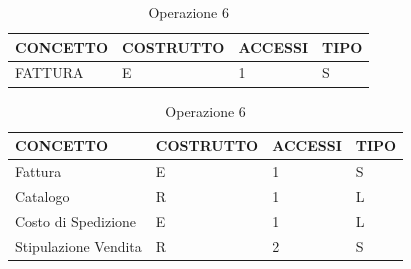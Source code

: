 \begin{table}[H]
\centering
\caption{Operazione 6}
\begin{tabular}{llll}
\\ \hline
\multicolumn{1}{|l|}{\textbf{CONCETTO}} & \multicolumn{1}{l|}{\textbf{COSTRUTTO}} & \multicolumn{1}{l|}{\textbf{ACCESSI}} & \multicolumn{1}{l|}{\textbf{TIPO}} \\ \hline
\multicolumn{1}{|l|}{FATTURA}
& \multicolumn{1}{l|}{E}                  & \multicolumn{1}{l|}{1}                & \multicolumn{1}{l|}{S}             \\ \hline
\end{tabular}
\end{table}


\begin{table}[H]
\centering
\caption{Operazione 6}
\begin{tabular}{llll}
\\ \hline
\multicolumn{1}{|l|}{\textbf{CONCETTO}} & \multicolumn{1}{l|}{\textbf{COSTRUTTO}} & \multicolumn{1}{l|}{\textbf{ACCESSI}} & \multicolumn{1}{l|}{\textbf{TIPO}} \\ \hline
\multicolumn{1}{|l|}{Fattura}
& \multicolumn{1}{l|}{E}                  & \multicolumn{1}{l|}{1}                & \multicolumn{1}{l|}{S}             \\ \hline
\multicolumn{1}{|l|}{Catalogo}             & \multicolumn{1}{l|}{R}                  & \multicolumn{1}{l|}{1}                & \multicolumn{1}{l|}{L}             \\ \hline
\multicolumn{1}{|l|}{Costo di Spedizione}     & \multicolumn{1}{l|}{E}                  & \multicolumn{1}{l|}{1}                & \multicolumn{1}{l|}{L}             \\ \hline
\multicolumn{1}{|l|}{Stipulazione Vendita}
& \multicolumn{1}{l|}{R}                  & \multicolumn{1}{l|}{2}                & \multicolumn{1}{l|}{S}             \\ \hline
\end{tabular}
\end{table}


